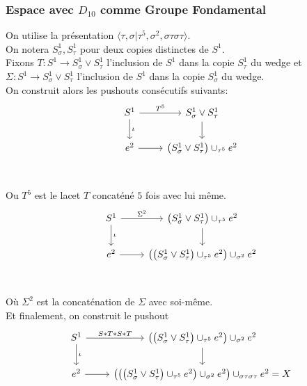 \documentclass[11pt, a4paper]{article}
\begin{document}
\subsubsection*{ Espace avec $D_{10}$ comme Groupe Fondamental}
On utilise la présentation $ \langle \tau, \sigma | \tau^{5}, \sigma^{2} , \sigma\tau\sigma\tau\rangle$.\\
On notera $S^{1}_\sigma, S^{1}_\tau$ pour deux copies distinctes de $S^{1}$.\\
Fixons $T: S^{1}\to S^{1}_\sigma \vee S^{1}_\tau$ l'inclusion de $S^1$ dans la copie $S^{1}_{\tau} $ du wedge et $\Sigma: S^{1}\to S^{1}_\sigma\vee S^{1}_\tau$ l'inclusion de $S^{1}$ dans la copie $S^{1}_{\sigma} $ du wedge.\\
On construit alors les pushouts consécutifs suivants:
\[\begin{tikzcd}
	{ S^{1}	} & { S^{1}_\sigma \vee S^{1}_\tau} \\
	{ e^{2}} & { \left( S^{1}_\sigma \vee S^{1}_\tau \right) \cup_{\tau^{5}}  e^{2}} \\
	\arrow[" T^{5} ", from=1-1, to=1-2]
	\arrow[ " \iota", from=1-1, to=2-1]
	\arrow[from=1-2, to=2-2]
	\arrow[from=2-1, to=2-2]
\end{tikzcd}\]
Ou $T^{5}$ est le lacet $T$ concaténé $5$ fois avec lui même.
\[\begin{tikzcd}
	{ S^{1}	} & {  \left( S^{1}_\sigma \vee S^{1}_\tau \right) \cup_{\tau^{5}}  e^{2}} \\
	{ e^{2}} & {  \left(  \left( S^{1}_\sigma \vee S^{1}_\tau \right) \cup_{\tau^{5}}  e^{2} \right)\cup_{\sigma^{2}} e^{2}} \\
	\arrow[" \Sigma^{2} ", from=1-1, to=1-2]
	\arrow[ " \iota", from=1-1, to=2-1]
	\arrow[from=1-2, to=2-2]
	\arrow[from=2-1, to=2-2]
\end{tikzcd}\]
Où $\Sigma^{2}$ est la concaténation de $\Sigma$ avec soi-même.\\
Et finalement, on construit le pushout
\[\begin{tikzcd}
	{ S^{1}	} & {  \left(  \left( S^{1}_\sigma \vee S^{1}_\tau \right) \cup_{\tau^{5}}  e^{2} \right)\cup_{\sigma^{2}} e^{2}} \\
	{ e^{2}} & { \left(  \left(  \left( S^{1}_\sigma \vee S^{1}_\tau \right) \cup_{\tau^{5}}  e^{2} \right)\cup_{\sigma^{2}} e^{2} \right)\cup_{\sigma\tau\sigma\tau} e^{2} = X} \\
	\arrow[" S \ast T \ast S\ast T ", from=1-1, to=1-2]
	\arrow[ " \iota", from=1-1, to=2-1]
	\arrow[from=1-2, to=2-2]
	\arrow[from=2-1, to=2-2]
\end{tikzcd}\]
\end{document}
